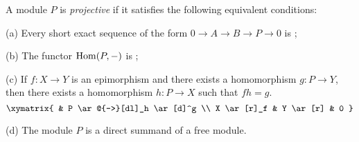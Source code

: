 \documentclass[12pt]{article}
\begin{document}
A module $P$ is {\it projective}
if it satisfies the following equivalent conditions:

(a) Every short exact sequence
of the form $0 \to A \to B \to P \to 0$ 
is ;

(b) The functor ${\rm Hom}(P, -)$ 
is ;

(c) If $f : X \to Y$ is an epimorphism
and there exists a homomorphism $g : P \to Y$,
then there exists a homomorphism $h : P \to X$
such that $fh = g$.
$$
\xymatrix{
  &
  P
        \ar@{-->}[dl]_h
        \ar[d]^g
  \\
  X
        \ar[r]_f
  &
  Y
        \ar[r]
  &
  0
}
$$

(d) The module $P$ is a direct summand of a free module.
\end{document}
